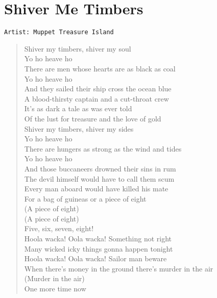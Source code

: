 \documentclass[11pt]{article}
\begin{document}
\section{Shiver Me Timbers}
\label{sec:orgf92832c}
\begin{verbatim}
Artist: Muppet Treasure Island
\end{verbatim}
\begin{verse}
Shiver my timbers, shiver my soul\\
Yo ho heave ho\\
There are men whose hearts are as black as coal\\
Yo ho heave ho\\
\vspace*{1em}
And they sailed their ship cross the ocean blue\\
A blood-thirsty captain and a cut-throat crew\\
It's as dark a tale as was ever told\\
Of the lust for treasure and the love of gold\\
\vspace*{1em}
Shiver my timbers, shiver my sides\\
Yo ho heave ho\\
There are hungers as strong as the wind and tides\\
Yo ho heave ho\\
And those buccaneers drowned their sins in rum\\
The devil himself would have to call them scum\\
Every man aboard would have killed his mate\\
For a bag of guineas or a piece of eight\\
(A piece of eight)\\
(A piece of eight)\\
\vspace*{1em}
Five, six, seven, eight!\\
\vspace*{1em}
Hoola wacka! Oola wacka! Something not right\\
Many wicked icky things gonna happen tonight\\
Hoola wacka! Oola wacka! Sailor man beware\\
When there's money in the ground there's murder in the air\\
(Murder in the air)\\
\vspace*{1em}
One more time now\\

\end{verse}
\end{document}
